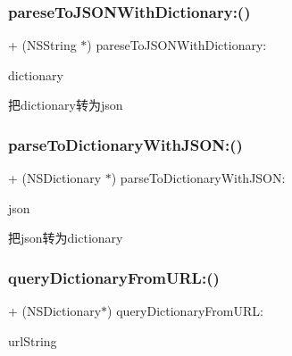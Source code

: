 \subsubsection{\texorpdfstring{parese\+To\+J\+S\+O\+N\+With\+Dictionary\+:()}{pareseToJSONWithDictionary:()}}
{\footnotesize\ttfamily + (N\+S\+String $\ast$) parese\+To\+J\+S\+O\+N\+With\+Dictionary\+: \begin{DoxyParamCaption}\item[{(N\+S\+Dictionary $\ast$)}]{dictionary }\end{DoxyParamCaption}}

把dictionary转为json \mbox{\label{interface_a_l_p_open_util_a4d8d47fd85ecc1cbc65472a93123a925}} 
\subsubsection{\texorpdfstring{parse\+To\+Dictionary\+With\+J\+S\+O\+N\+:()}{parseToDictionaryWithJSON:()}}
{\footnotesize\ttfamily + (N\+S\+Dictionary $\ast$) parse\+To\+Dictionary\+With\+J\+S\+O\+N\+: \begin{DoxyParamCaption}\item[{(N\+S\+String $\ast$)}]{json }\end{DoxyParamCaption}}

把json转为dictionary \mbox{\label{interface_a_l_p_open_util_a8d5e6196d040edc82f548ac156d91259}} 
\subsubsection{\texorpdfstring{query\+Dictionary\+From\+U\+R\+L\+:()}{queryDictionaryFromURL:()}}
{\footnotesize\ttfamily + (N\+S\+Dictionary$\ast$) query\+Dictionary\+From\+U\+R\+L\+: \begin{DoxyParamCaption}\item[{(N\+S\+String $\ast$)}]{url\+String }\end{DoxyParamCaption}}


